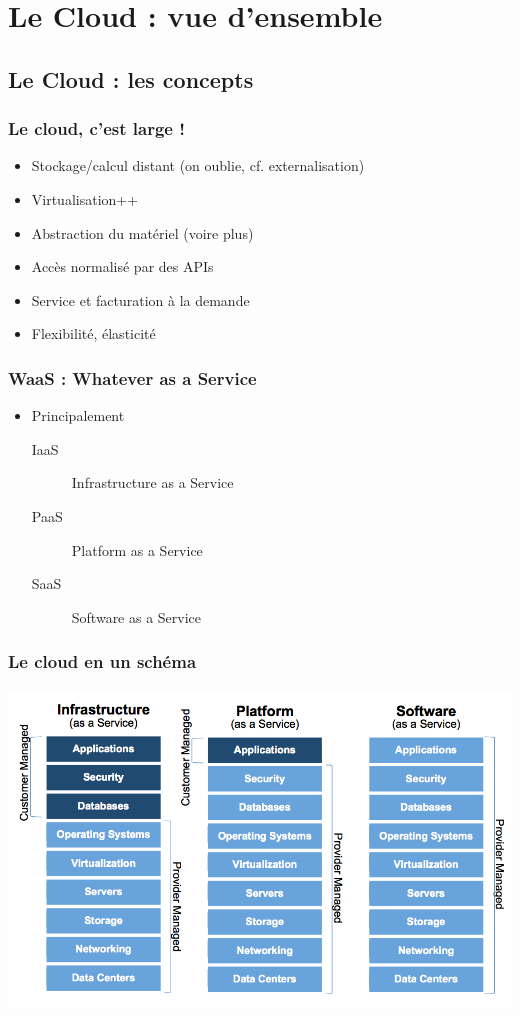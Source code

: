\section[Cloud]{Le Cloud : vue d'ensemble}

\subsection[Cloud]{Le Cloud : les concepts}

  \begin{frame}
    \frametitle{Le cloud, c'est large !}
    \begin{itemize}
      \item Stockage/calcul distant \pause (on oublie, cf. externalisation)\pause
      \item Virtualisation++\pause
      \item Abstraction du matériel (voire plus)\pause
      \item Accès normalisé par des APIs\pause
      \item Service et facturation à la demande\pause
      \item Flexibilité, élasticité
    \end{itemize}
  \end{frame}

  \begin{frame}
    \frametitle{WaaS : Whatever as a Service}
    \begin{itemize}
      \item Principalement\pause
      \begin{description}
        \item[IaaS] Infrastructure as a Service\pause
        \item[PaaS] Platform as a Service\pause
        \item[SaaS] Software as a Service\pause
      \end{description}
    \end{itemize}
  \end{frame}

  \begin{frame}
    \frametitle{Le cloud en un schéma}
    \includegraphics[width=\linewidth,height=\textheight]{images/cloud.png}
  \end{frame}

